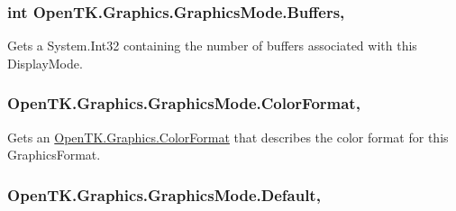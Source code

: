 \hypertarget{class_open_t_k_1_1_graphics_1_1_graphics_mode_a6a53197afd7dc314e2d42a7d22c16bfe}{
\subsubsection[{Buffers}]{\setlength{\rightskip}{0pt plus 5cm}int Open\-T\-K.\-Graphics.\-Graphics\-Mode.\-Buffers\hspace{0.3cm}{\ttfamily [get]}, {\ttfamily [set]}}}\label{class_open_t_k_1_1_graphics_1_1_graphics_mode_a6a53197afd7dc314e2d42a7d22c16bfe}


Gets a System.\-Int32 containing the number of buffers associated with this Display\-Mode. 

\hypertarget{class_open_t_k_1_1_graphics_1_1_graphics_mode_ae10e9972591996e85c2fedca3f86a5e4}{
\subsubsection[{Color\-Format}]{ Open\-T\-K.\-Graphics.\-Graphics\-Mode.\-Color\-Format\hspace{0.3cm}{\ttfamily [get]}, {\ttfamily [set]}}}\label{class_open_t_k_1_1_graphics_1_1_graphics_mode_ae10e9972591996e85c2fedca3f86a5e4}


Gets an \hyperlink{struct_open_t_k_1_1_graphics_1_1_color_format}{Open\-T\-K.\-Graphics.\-Color\-Format} that describes the color format for this Graphics\-Format. 

\hypertarget{class_open_t_k_1_1_graphics_1_1_graphics_mode_a3280654ce982edbd728f83c06cd21c07}{
\subsubsection[{Default}]{ Open\-T\-K.\-Graphics.\-Graphics\-Mode.\-Default\hspace{0.3cm}{\ttfamily [static]}, {\ttfamily [get]}}}\label{class_open_t_k_1_1_graphics_1_1_graphics_mode_a3280654ce982edbd728f83c06cd21c07}


